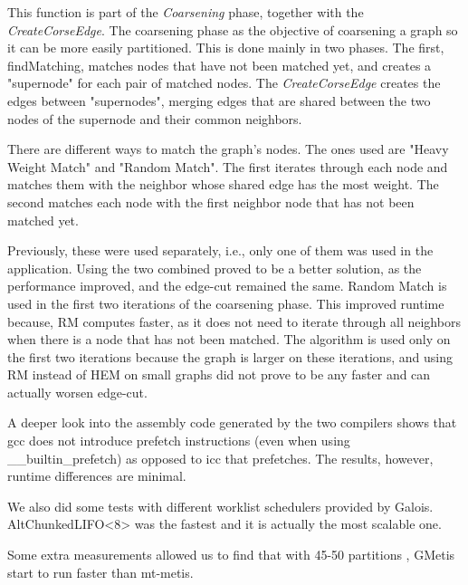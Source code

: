 \documentclass[abstract=on,9pt,twocolumn]{scrartcl}
\begin{document}
This function is part of the \textit{Coarsening} phase, together with
the \textit{CreateCorseEdge}.
The coarsening phase as the objective of coarsening a graph so it can be
more easily partitioned. This is done mainly in two phases. The first,
findMatching, matches nodes that have not been matched yet, and creates
a "supernode" for each pair of matched nodes. The
\textit{CreateCorseEdge} creates the edges between "supernodes", merging
edges that are shared between the two nodes of the supernode and their
common neighbors.


There are different ways to match the graph's nodes. The ones used are
"Heavy Weight Match" and "Random Match". The first iterates through each
node and matches them with the neighbor whose shared edge has the most
weight. The second matches each node with the first neighbor node that
has not been matched yet.

Previously, these were used separately, i.e., only one of them was
used in the application. Using the two combined proved to be a better
solution, as the performance improved, and the edge-cut remained the
same. Random Match is used in the first two iterations of the coarsening
phase. This improved runtime because, RM computes faster, as it does not
need to iterate through all neighbors when there is a node that has not
been matched. The algorithm is used only on the first two iterations
because the graph is larger on these iterations, and using RM instead of
HEM on small graphs did not prove to be any faster and can actually worsen
edge-cut.

A deeper look into the assembly code generated by the two compilers
shows that gcc does not introduce prefetch instructions (even when using
\_\_builtin\_prefetch) as opposed to icc that prefetches. The results,
however, runtime differences are minimal.

We also did some tests with different worklist schedulers provided by
Galois. AltChunkedLIFO<8> was the fastest and it is actually the most
scalable one.

Some extra measurements allowed us to find that with 45-50 partitions
, GMetis start to run faster than mt-metis.
\end{document}
